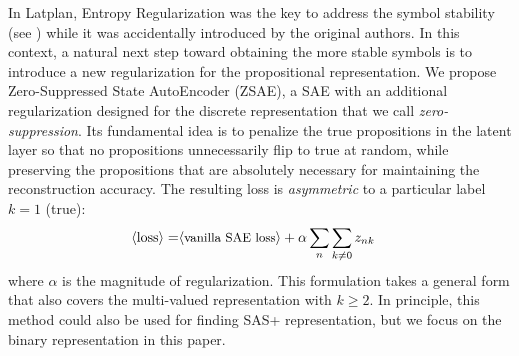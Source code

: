 In Latplan, Entropy Regularization was the key to address the symbol stability (see )
while it was accidentally introduced by the original authors.
In this context, a natural next step toward obtaining the more stable symbols is to introduce a new regularization
for the propositional representation.
We propose Zero-Suppressed State AutoEncoder (ZSAE),
a SAE with an additional regularization designed for the discrete representation that we call \emph{zero-suppression}.
% 
Its fundamental idea is to penalize the
true propositions in the latent layer so that no propositions unnecessarily flip to true at random,
while preserving the propositions that are absolutely necessary for maintaining the reconstruction accuracy.
% 
The resulting loss is 
\emph{asymmetric} to a particular label $k=1$ (true):
\begin{align*}
 \brackets{\text{loss}} = & \brackets{\text{\small vanilla SAE loss}} + \alpha \sum_n \sum_{k\not=0} z_{nk} %
\end{align*}
where $\alpha$ is the magnitude of regularization.
This formulation takes a general form
that also covers the multi-valued representation with $k\geq 2$.
In principle, this method could also be used for finding SAS+ representation,
but we focus on the binary representation in this paper.

